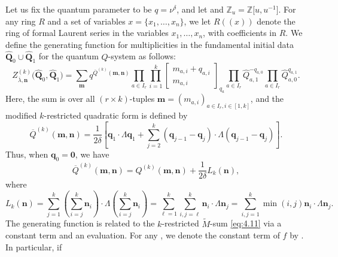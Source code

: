 \documentclass[10pt,a4paper]{amsart}
\numberwithin{equation}{section}
\begin{document}
Let us fix the quantum parameter to be $q=\nu^{\delta}$, and let  and $\mathbb{Z}_u= \mathbb{Z}\bigl[u,u^{-1}\bigr]$. For any ring $R$ and a set of variables $x=\{x_1,\dots,x_n\}$, we let $R((x))$ denote the ring of formal Laurent series in the variables $x_1,\dots,x_n$, with coefficients in $R$. We define the generating function for multiplicities
in the fundamental initial data ${\widehat{\mathbf{Q}}_0\cup \widehat{\mathbf{Q}}_1}$ for the quantum $Q$-system as follows:
\begin{equation}\label{eq:4.13}
Z_{\overline{\lambda},\mathbf{n}}^{(k)}\bigl(\widehat{\mathbf{ Q}}_0,\widehat{\mathbf{Q}}_1\bigr)
=\sum_{\mathbf{m}}q^{\overline{Q}^{(k)}(\mathbf{m},\mathbf{ n})} \prod_{a\in I_r}\prod_{i=1}^k\begin{bmatrix}m_{ a,i}+q_{a,i}\\m_{a,i}\end{bmatrix}_{q_a}\prod_{a\in I_r}\widehat{Q}_{a,1}^{-q_{a,0}} \prod_{a\in I_r}\widehat{Q}_{a,0}^{q_{a,1}}.
\end{equation}
Here, the sum is over all $(r\times k)$-tuples $\mathbf{m}=(m_{a,i})_{a\in I_r,i\in[1,k]}$, and the modified $k$-restricted quadratic form  is defined by
\begin{equation*}
\overline{Q}^{(k)}(\mathbf{m},\mathbf{n})
=\frac{1}{2\delta}\left[\mathbf{q}_1\cdot\Lambda\mathbf{q}_1+ \sum_{j=2}^k(\mathbf{q}_{j-1}-\mathbf{q}_j)\cdot\Lambda (\mathbf{q}_{j-1}-\mathbf{q}_j)\right].
\end{equation*}
Thus, when $\mathbf{q}_0=\mathbf{0}$, we have
\begin{equation}\label{eq:4.15}
\overline{Q}^{(k)}(\mathbf{m},\mathbf{n})= Q^{(k)}(\mathbf{m},\mathbf{n})+\frac{1}{2\delta} L_k(\mathbf{n}),
\end{equation}
where
\begin{equation*}
L_k(\mathbf{n})
=\sum_{j=1}^k\left(\sum_{i=j}^k\mathbf{n}_i\right)\cdot\Lambda\left(\sum_{i=j}^k\mathbf{n}_i\right)
=\sum_{\ell=1}^k\sum_{i,j=\ell}^k\mathbf{n}_i\cdot\Lambda\mathbf{n}_j
=\sum_{i,j=1}^k\min(i,j)\mathbf{n}_i\cdot\Lambda\mathbf{n}_j.
\end{equation*}
The generating function  is related to the $k$-restricted $\tilde{M}$-sum  \eqref{eq:4.11} via a constant term and an evaluation. For any , we denote the constant term of $f$ by . In particular, if
\end{document}
